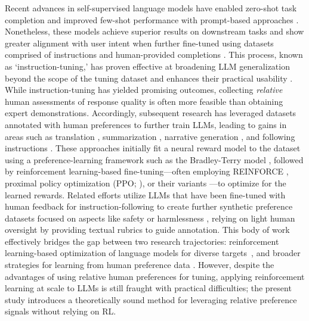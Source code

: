Recent advances in self-supervised language models have enabled zero-shot task completion \citep{radford2019language} and improved few-shot performance with prompt-based approaches \citep{gpt3,megatron,chowdhery2022palm}. Nonetheless, these models achieve superior results on downstream tasks and show greater alignment with user intent when further fine-tuned using datasets comprised of instructions and human-provided completions \citep{mishra-etal-2022-cross,sanh2022multitask,chung2022scaling,thoppilan2022lamda}. This process, known as `instruction-tuning,' has proven effective at broadening LLM generalization beyond the scope of the tuning dataset and enhances their practical usability \citep{chung2022scaling}. While instruction-tuning has yielded promising outcomes, collecting \textit{relative} human assessments of response quality is often more feasible than obtaining expert demonstrations. Accordingly, subsequent research has leveraged datasets annotated with human preferences to further train LLMs, leading to gains in areas such as translation \citep{kreutzer-etal-2018-reliability}, summarization \citep{stiennon2022learning,ziegler2020finetuning}, narrative generation \citep{ziegler2020finetuning}, and following instructions \citep{ouyang2022training,ramamurthy2023is}. These approaches initially fit a neural reward model to the dataset using a preference-learning framework such as the Bradley-Terry model \citep{bradley1952rankanalysis}, followed by reinforcement learning-based fine-tuning—often employing REINFORCE \citep{williams1992reinforce}, proximal policy optimization (PPO; \cite{schulman2017proximal}), or their variants \citep{ramamurthy2023is}—to optimize for the learned rewards. Related efforts utilize LLMs that have been fine-tuned with human feedback for instruction-following to create further synthetic preference datasets focused on aspects like safety or harmlessness \citep{bai2022constitutional}, relying on light human oversight by providing textual rubrics to guide annotation. This body of work effectively bridges the gap between two research trajectories: reinforcement learning-based optimization of language models for diverse targets~\citep{Ranzato2015SequenceLT,paulus2018a,wu2018learning}, and broader strategies for learning from human preference data \citep{christiano2017deep,kupcsik2018learning}. However, despite the advantages of using relative human preferences for tuning, applying reinforcement learning at scale to LLMs is still fraught with practical difficulties; the present study introduces a theoretically sound method for leveraging relative preference signals without relying on RL.

